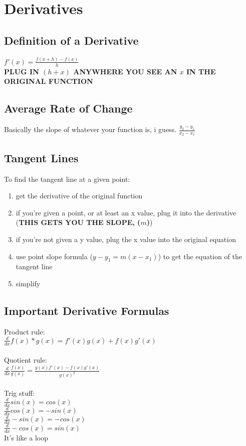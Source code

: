 \documentclass{article}
\begin{document}
\section{Derivatives}

\subsection{Definition of a Derivative}
$f'(x) = \frac{f(x+h) - f(x)}{h}$\\
\textbf{PLUG IN $(h + x)$ ANYWHERE YOU SEE AN $x$ IN THE ORIGINAL FUNCTION}

\subsection{Average Rate of Change}
Basically the slope of whatever your function is, i guess.
$\frac{y_{2} - y_{1}}{x_{2}-x_{1}}$

\subsection{Tangent Lines}
To find the tangent line at a given point:
\begin{enumerate}
\item get the derivative of the original function
\item if you're given a point, or at least an x value, plug it into the derivative (\textbf{THIS GETS YOU THE SLOPE, ($m$)})
\item if you're not given a y value, plug the x value into the original equation
\item use point slope formula ($y - y_{1} = m(x - x_{1})$) to get the equation of the tangent line
\item simplify
\end{enumerate}

\subsection{Important Derivative Formulas}
Product rule:\\
$\frac{d}{dx} f(x) * g(x) = f'(x)g(x) + f(x)g'(x)$\\
\\
Quotient rule:\\
$\frac{d}{dx} \frac{f(x)}{g(x)} = \frac{g(x)f'(x) - f(x)g'(x)}{g(x)^2}$\\
\\
Trig stuff:\\
$\frac{d}{dx} sin(x) = cos(x)$\\
$\frac{d}{dx} cos(x) = -sin(x)$\\
$\frac{d}{dx} -sin(x) = -cos(x)$\\
$\frac{d}{dx} -cos(x) = sin(x)$\\
It's like a loop
\end{document}
